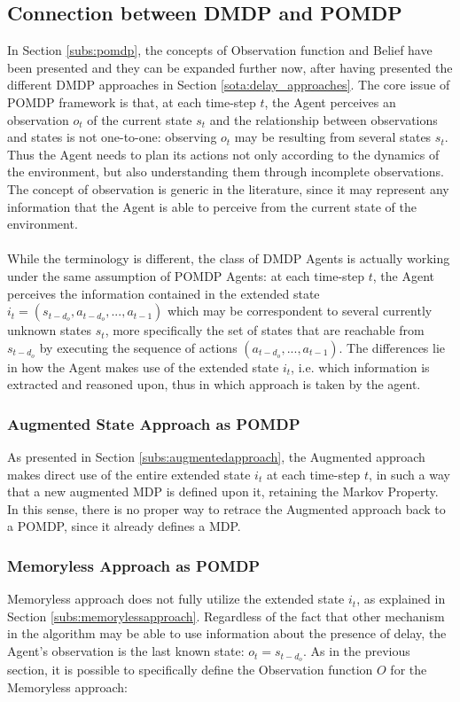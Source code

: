        \subsection{Connection between DMDP and POMDP}
            In Section \ref{subs:pomdp}, the concepts of Observation function and Belief have been presented and they can be expanded further now, after having presented the different DMDP approaches in Section \ref{sota:delay_approaches}. The core issue of POMDP framework is that, at each time-step $t$, the Agent perceives an observation $o_t$ of the current state $s_t$ and the relationship between observations and states is not one-to-one: observing $o_t$ may be resulting from several states $s_t$. Thus the Agent needs to plan its actions not only according to the dynamics of the environment, but also understanding them through incomplete observations. The concept of observation is generic in the literature, since it may represent any information that the Agent is able to perceive from the current state of the environment.
            \\\\
            While the terminology is different, the class of DMDP Agents is actually working under the same assumption of POMDP Agents: at each time-step $t$, the Agent perceives the information contained in the extended state $i_t = (s_{t-d_o}, a_{t-d_o}, ..., a_{t-1})$ which may be correspondent to several currently unknown states $s_t$, more specifically the set of states that are reachable from $s_{t-d_o}$ by executing the sequence of actions $(a_{t-d_o}, ..., a_{t-1})$. The differences lie in how the Agent makes use of the extended state $i_t$, i.e. which information is extracted and reasoned upon, thus in which approach is taken by the agent.
            
            \subsubsection{Augmented State Approach as POMDP}
                As presented in Section \ref{subs:augmentedapproach}, the Augmented approach makes direct use of the entire extended state $i_t$ at each time-step $t$, in such a way that a new augmented MDP is defined upon it, retaining the Markov Property. In this sense, there is no proper way to retrace the Augmented approach back to a POMDP, since it already defines a MDP.
            
            \subsubsection{Memoryless Approach as POMDP}
                Memoryless approach does not fully utilize the extended state $i_t$, as explained in Section \ref{subs:memorylessapproach}. Regardless of the fact that other mechanism in the algorithm may be able to use information about the presence of delay, the Agent's observation is the last known state: $o_t = s_{t-d_o}$. As in the previous section, it is possible to specifically define the Observation function $O$ for the Memoryless approach:
                
